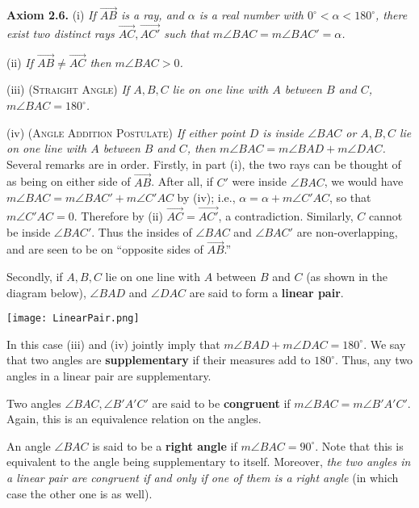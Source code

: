 \documentclass[leqno]{book}
\begin{document}
\noindent\textbf{Axiom 2.6.} (i) \emph{If $\overset{\longrightarrow}{AB}$ is a ray, and $\alpha$ is a real number with $0^\circ<\alpha<180^\circ$, there exist two distinct rays $\overset{\longrightarrow}{AC},\overset{\longrightarrow}{AC'}$ such that $m\angle BAC=m\angle BAC'=\alpha$.}

(ii) \emph{If $\overset{\longrightarrow}{AB}\ne\overset{\longrightarrow}{AC}$ then $m\angle BAC>0$.}

(iii) \textsc{(Straight Angle)} \emph{If $A,B,C$ lie on one line with $A$ between $B$ and $C$, $m\angle BAC=180^\circ$.}

(iv) \textsc{(Angle Addition Postulate)} \emph{If either point $D$ is inside $\angle BAC$ or $A,B,C$ lie on one line with $A$ between $B$ and $C$, then $m\angle BAC=m\angle BAD+m\angle DAC$.}\\

\noindent Several remarks are in order.  Firstly, in part (i), the two rays can be thought of as being on either side of $\overset{\longrightarrow}{AB}$.  After all, if $C'$ were inside $\angle BAC$, we would have $m\angle BAC=m\angle BAC'+m\angle C'AC$ by (iv); i.e., $\alpha=\alpha+m\angle C'AC$, so that $m\angle C'AC=0$.  Therefore by (ii) $\overset{\longrightarrow}{AC}=\overset{\longrightarrow}{AC'}$, a contradiction.  Similarly, $C$ cannot be inside $\angle BAC'$.  Thus the insides of $\angle BAC$ and $\angle BAC'$ are non-overlapping, and are seen to be on ``opposite sides of $\overset{\longrightarrow}{AB}$.''

Secondly, if $A,B,C$ lie on one line with $A$ between $B$ and $C$ (as shown in the diagram below), $\angle BAD$ and $\angle DAC$ are said to form a \textbf{linear pair}.
\begin{center}\texttt{[image: LinearPair.png]}\end{center}
In this case (iii) and (iv) jointly imply that $m\angle BAD+m\angle DAC=180^\circ$.  We say that two angles are \textbf{supplementary} if their measures add to $180^\circ$.  Thus, any two angles in a linear pair are supplementary.

Two angles $\angle BAC,\angle B'A'C'$ are said to be \textbf{congruent} if $m\angle BAC=m\angle B'A'C'$.  Again, this is an equivalence relation on the angles.

An angle $\angle BAC$ is said to be a \textbf{right angle} if $m\angle BAC=90^\circ$.  Note that this is equivalent to the angle being supplementary to itself.  Moreover, \emph{the two angles in a linear pair are congruent if and only if one of them is a right angle} (in which case the other one is as well).
\end{document}
